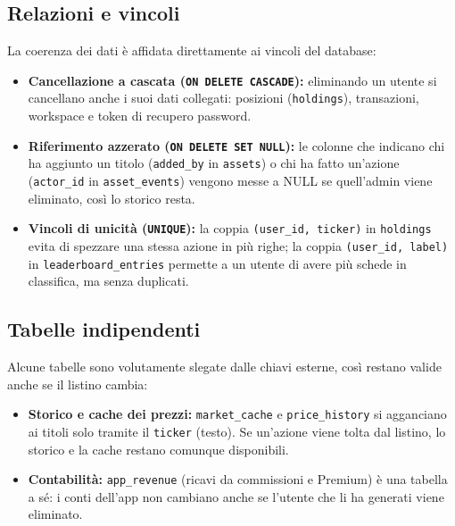 \subsection{Relazioni e vincoli}
La coerenza dei dati è affidata direttamente ai vincoli del database:

\begin{itemize}
    \item \textbf{Cancellazione a cascata (\texttt{ON DELETE CASCADE}):} eliminando un utente si cancellano anche i suoi dati collegati: posizioni (\texttt{holdings}), transazioni, workspace e token di recupero password.
    \item \textbf{Riferimento azzerato (\texttt{ON DELETE SET NULL}):} le colonne che indicano chi ha aggiunto un titolo (\texttt{added\_by} in \texttt{assets}) o chi ha fatto un'azione (\texttt{actor\_id} in \texttt{asset\_events}) vengono messe a NULL se quell'admin viene eliminato, così lo storico resta.
    \item \textbf{Vincoli di unicità (\texttt{UNIQUE}):} la coppia \texttt{(user\_id, ticker)} in \texttt{holdings} evita di spezzare una stessa azione in più righe; la coppia \texttt{(user\_id, label)} in \texttt{leaderboard\_\allowbreak{}entries} permette a un utente di avere più schede in classifica, ma senza duplicati.
\end{itemize}

\subsection{Tabelle indipendenti}
Alcune tabelle sono volutamente slegate dalle chiavi esterne, così restano valide anche se il listino cambia:

\begin{itemize}
    \item \textbf{Storico e cache dei prezzi:} \texttt{market\_\allowbreak{}cache} e \texttt{price\_\allowbreak{}history} si agganciano ai titoli solo tramite il \texttt{ticker} (testo). Se un'azione viene tolta dal listino, lo storico e la cache restano comunque disponibili.
    \item \textbf{Contabilità:} \texttt{app\_\allowbreak{}revenue} (ricavi da commissioni e Premium) è una tabella a sé: i conti dell'app non cambiano anche se l'utente che li ha generati viene eliminato.
\end{itemize}